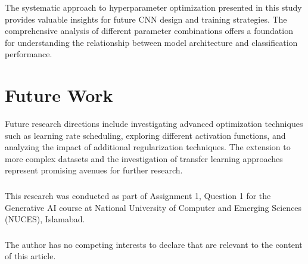 \documentclass[norunningheads]{llncs}
\begin{document}
The systematic approach to hyperparameter optimization presented in this study provides valuable insights for future CNN design and training strategies. The comprehensive analysis of different parameter combinations offers a foundation for understanding the relationship between model architecture and classification performance.

\section{Future Work}

Future research directions include investigating advanced optimization techniques such as learning rate scheduling, exploring different activation functions, and analyzing the impact of additional regularization techniques. The extension to more complex datasets and the investigation of transfer learning approaches represent promising avenues for further research.

\begin{credits}
\subsubsection{\ackname}
This research was conducted as part of Assignment 1, Question 1 for the Generative AI course at National University of Computer and Emerging Sciences (NUCES), Islamabad.

\subsubsection{\discintname}
The author has no competing interests to declare that are relevant to the content of this article.
\end{credits}
\end{document}
